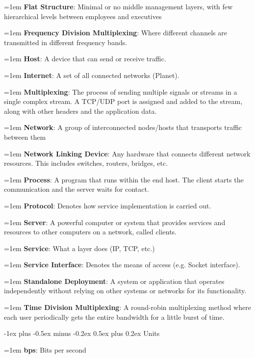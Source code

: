 \documentclass[letterpaper,8pt]{extarticle}
\makeatletter
\newcommand{\definition}[2]{
  \hangindent=1em
  \textbf{#1}: #2%
}
\renewcommand{\section}{\@startsection{section}{1}{0mm}%
  {-1ex plus -0.5ex minus -0.2ex}%
  {0.5ex plus 0.2ex}%
{\color{h1} \normalfont\small\bfseries}}
\makeatother
\begin{document}
\begin{multicols*}{5}
  \definition{Flat Structure}{Minimal or no middle management layers, with few hierarchical levels between employees and executives}
  
  \definition{Frequency Division Multiplexing}{Where different channels are transmitted in different frequency bands.}
  
  \definition{Host}{A device that can send or receive traffic.}
  
  \definition{Internet}{A set of all connected networks (Planet).}
  
  \definition{Multiplexing}{The process of sending multiple signals or streams in a single complex stream. A TCP/UDP port is assigned and added to the stream, along with other headers and the application data.}
  
  \definition{Network}{A group of interconnected nodes/hosts that transports traffic between them}
  
  \definition{Network Linking Device}{Any hardware that connects different network resources. This includes switches, routers, bridges, etc.}
  
  \definition{Process}{A program that runs within the end host. The client starts the communication and the server waits for contact.}
  
  \definition{Protocol}{Denotes how service implementation is carried out.}
  
  \definition{Server}{A powerful computer or system that provides services and resources to other computers on a network, called clients.}
  
  \definition{Service}{What a layer does (IP, TCP, etc.)}
  
  \definition{Service Interface}{Denotes the means of access (e.g. Socket interface).}
  
  \definition{Standalone Deployment}{A system or application that operates independently without relying on other systems or networks for its functionality.}
  
  \definition{Time Division Multiplexing}{A round-robin multiplexing method where each user periodically gets the entire bandwidth for a little burst of time.}
  
  \section{Units}
  
  \begin{multicols*}{2}
    
    \definition{bps}{Bits per second}
    

\end{multicols*}
\end{multicols*}
\end{document}
